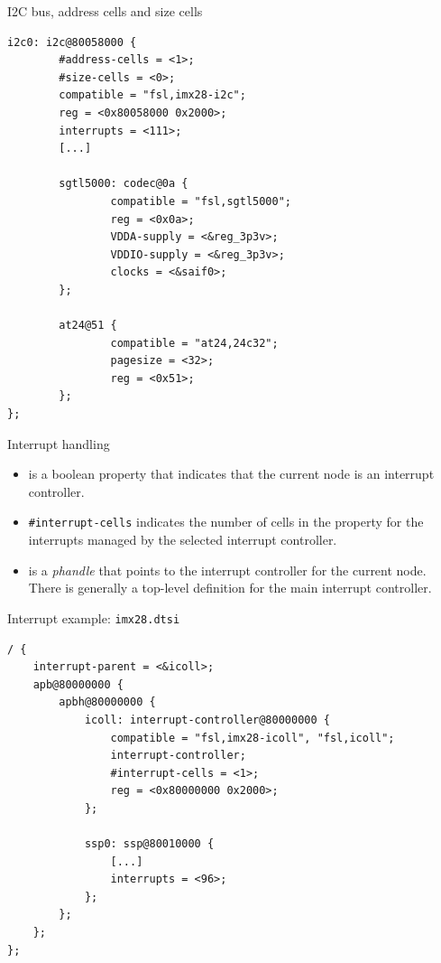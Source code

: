 \documentclass[obeyspaces,spaces,hyphens]{beamer}
\begin{document}
\begin{frame}[fragile]{I2C bus, address cells and size cells}
  \begin{block}{}
\begin{verbatim}
i2c0: i2c@80058000 {
        #address-cells = <1>;
        #size-cells = <0>;
        compatible = "fsl,imx28-i2c";
        reg = <0x80058000 0x2000>;
        interrupts = <111>;
        [...]

        sgtl5000: codec@0a {
                compatible = "fsl,sgtl5000";
                reg = <0x0a>;
                VDDA-supply = <&reg_3p3v>;
                VDDIO-supply = <&reg_3p3v>;
                clocks = <&saif0>;
        };

        at24@51 {
                compatible = "at24,24c32";
                pagesize = <32>;
                reg = <0x51>;
        };
};
\end{verbatim}
\end{block}
\end{frame}

\begin{frame}{Interrupt handling}
  \begin{itemize}
  \item {} is a boolean property that
    indicates that the current node is an interrupt controller.
  \item { {\tt \#interrupt-cells}} indicates
    the number of cells in the  property for the
    interrupts managed by the selected interrupt controller.
  \item {} is a {\em phandle} that points to the
    interrupt controller for the current node. There is generally a
    top-level  definition for the main
    interrupt controller.
  \end{itemize}
\end{frame}

\begin{frame}[fragile]{Interrupt example: {\tt imx28.dtsi}}
  \begin{block}{}
    \begin{verbatim}
/ {
    interrupt-parent = <&icoll>;
    apb@80000000 {
        apbh@80000000 {
            icoll: interrupt-controller@80000000 {
                compatible = "fsl,imx28-icoll", "fsl,icoll";
                interrupt-controller;
                #interrupt-cells = <1>;
                reg = <0x80000000 0x2000>;
            };

            ssp0: ssp@80010000 {
                [...]
                interrupts = <96>;
            };
        };
    };
};
    \end{verbatim}
  \end{block}
\end{frame}
\end{document}
